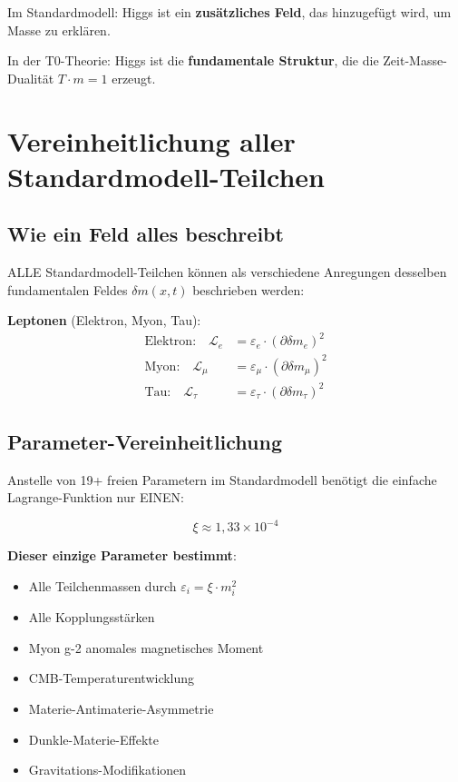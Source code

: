 \documentclass[12pt,a4paper]{article}
\newcommand{\Lag}{\mathcal{L}}
\newcommand{\deltam}{\delta m}
\newcommand{\xipar}{\xi}
\theoremstyle{definition}
\theoremstyle{remark}
\begin{document}
	\begin{tcolorbox}[colback=purple!5!white,colframe=purple!75!black,title=Higgs-Integration in T0-Theorie]
		Im Standardmodell: Higgs ist ein \textbf{zusätzliches Feld}, das hinzugefügt wird, um Masse zu erklären.
		
		In der T0-Theorie: Higgs ist die \textbf{fundamentale Struktur}, die die Zeit-Masse-Dualität $T \cdot m = 1$ erzeugt.
	\end{tcolorbox}
	
	\section{Vereinheitlichung aller Standardmodell-Teilchen}
	
	\subsection{Wie ein Feld alles beschreibt}
	
	ALLE Standardmodell-Teilchen können als verschiedene Anregungen desselben fundamentalen Feldes $\deltam(x,t)$ beschrieben werden:
	
	\textbf{Leptonen} (Elektron, Myon, Tau):
	\begin{align}
		\text{Elektron:} \quad \Lag_e &= \varepsilon_e \cdot (\partial \deltam_e)^2 \\
		\text{Myon:} \quad \Lag_{\mu} &= \varepsilon_{\mu} \cdot (\partial \deltam_{\mu})^2 \\
		\text{Tau:} \quad \Lag_{\tau} &= \varepsilon_{\tau} \cdot (\partial \deltam_{\tau})^2
	\end{align}
	
	\subsection{Parameter-Vereinheitlichung}
	
	Anstelle von 19+ freien Parametern im Standardmodell benötigt die einfache Lagrange-Funktion nur EINEN:
	
	\begin{equation}
		\xipar \approx 1{,}33 \times 10^{-4}
		\label{eq:universal_parameter}
	\end{equation}
	
	\textbf{Dieser einzige Parameter bestimmt}:
	\begin{itemize}
		\item Alle Teilchenmassen durch $\varepsilon_i = \xipar \cdot m_i^2$
		\item Alle Kopplungsstärken
		\item Myon g-2 anomales magnetisches Moment
		\item CMB-Temperaturentwicklung
		\item Materie-Antimaterie-Asymmetrie
		\item Dunkle-Materie-Effekte
		\item Gravitations-Modifikationen
	\end{itemize}
	
\end{document}
